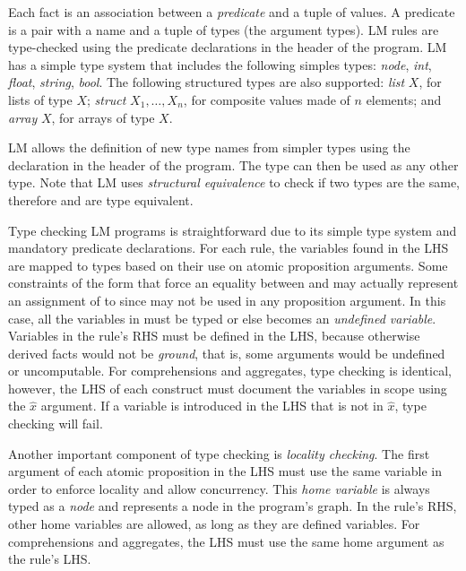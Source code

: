 Each fact is an association between a \emph{predicate} and a tuple of values. A
predicate is a pair with a name and a tuple of types (the argument types). LM
rules are type-checked using the predicate declarations in the header of the
program. LM has a simple type system that includes the following simples types:
\emph{node}, \emph{int}, \emph{float}, \emph{string}, \emph{bool}. The following
structured types are also supported: \emph{list} $X$, for lists of type $X$;
\emph{struct} $X_1, \ldots, X_n$, for composite values made of $n$ elements; and
\emph{array} $X$, for arrays of type $X$.

LM allows the definition of new type names from simpler types using the declaration
 in the header of the program. The type
 can then be used as any other type. Note that LM uses
\emph{structural equivalence} to check if two types are the same, therefore
 and  are type equivalent.

Type checking LM programs is straightforward due to its simple type system and
mandatory predicate declarations. For each rule, the variables found in the LHS
are mapped to types based on their use on atomic proposition arguments. Some
constraints of the form  that force an equality between
 and  may actually represent an assignment of
 to  since  may not be used in any proposition
argument. In this case, all the variables in  must be typed or
else  becomes an \emph{undefined variable}. Variables in the rule's RHS
must be defined in the LHS, because otherwise derived facts would not be
\emph{ground}, that is, some arguments would be undefined or uncomputable.  For
comprehensions and aggregates, type checking is identical, however, the LHS of
each construct must document the variables in scope using the $\hat{x}$
argument. If a variable is introduced in the LHS that is not in $\hat{x}$, type
checking will fail.

Another important component of type checking is \emph{locality checking}. The
first argument of each atomic proposition in the LHS must use the same variable
in order to enforce locality and allow concurrency. This \emph{home variable} is
always typed as a \emph{node} and represents a node in the program's graph. In
the rule's RHS, other home variables are allowed, as long as they are defined
variables. For comprehensions and aggregates, the LHS must use the same home
argument as the rule's LHS.

